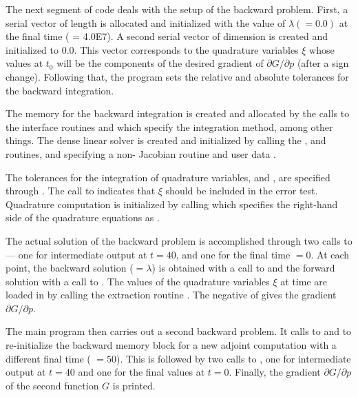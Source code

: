 The next segment of code deals with the setup of the backward problem. 
First, a serial vector  of length  is allocated and initialized with the
value of $\lambda (= 0.0)$ at the final time ( = 4.0E7).  A second
serial vector  of dimension  is created and initialized to $0.0$.
This vector corresponds to the quadrature variables $\xi$ whose values at $t_0$
will be the components of the desired gradient of $\partial G / \partial p$
(after a sign change).
Following that, the program sets the relative and absolute tolerances
for the backward integration.

The {\cvodes} memory for the backward integration is created and allocated
by the calls to the interface routines  and  which 
specify the  integration method, among other things.  The
dense linear solver is created and initialized by calling the
,  and
 routines, and specifying a non-
Jacobian routine  and user data .

The tolerances for the integration of quadrature variables,  and
, are specified through .
The call to  indicates that $\xi$ should be included
in the error test.
Quadrature computation is initialized by calling 
which specifies the right-hand side of the quadrature equations as .

The actual solution of the backward problem is accomplished through
two calls to  --- one for intermediate output at $t = 40$,
and one for the final time  $= 0$.  At each point, the backward
solution  ($ = \lambda$) is obtained with a call to  and the
forward solution with a call to .  The values of the
quadrature variables $\xi$ at time  are loaded in  by calling
the extraction routine . The negative of 
gives the gradient $\partial G / \partial p$.

The main program then carries out a second backward problem.
It calls to  and  to re-initialize the 
backward memory block for a new adjoint computation with a different final 
time ( $= 50$).  This is followed by two calls to ,
one for intermediate output at $t = 40$ and one for the final values at
$t = 0$.  Finally, the gradient $\partial G / \partial p$ of the second
function $G$ is printed.

